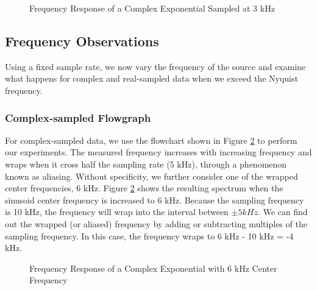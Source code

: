 \documentclass{article}
\begin{document}
\begin{figure}[H]
	\centerline{}
	\caption{Frequency Response of a Complex Exponential Sampled at 3 kHz}
	\label{fig::complex_sampling_freq_domain_3k_samp_rate}
\end{figure}

\subsection{Frequency Observations}

Using a fixed sample rate, we now vary the frequency of the source and examine what happens for complex and real-sampled data when we exceed the Nyquist frequency.

\subsubsection{Complex-sampled Flowgraph}

For complex-sampled data, we use the flowchart shown in Figure \ref{fig::freq_observations_complex_6k_center_freq} to perform our experiments. The measured frequency increases with increasing frequency and wraps when it cross half the sampling rate (5 kHz), through a phenomenon known as aliasing. Without specificity, we further consider one of the wrapped center frequencies, 6 kHz. Figure \ref{fig::freq_observations_complex_6k_center_freq} shows the resulting spectrum when the sinusoid center frequency is increased to 6 kHz. Because the sampling frequency is 10 kHz, the frequency will wrap into the interval between $\pm 5 kHz$. We can find out the wrapped (or aliased) frequency by adding or subtracting multiples of the sampling frequency. In this case, the frequency wraps to 6 kHz - 10 kHz = -4 kHz.

\begin{figure}[H]
	\centerline{}
	\caption{Frequency Response of a Complex Exponential with 6 kHz Center Frequency}
	\label{fig::freq_observations_complex_6k_center_freq}
\end{figure}
\end{document}
